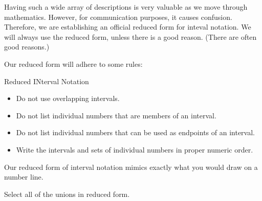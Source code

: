 \documentclass{ximera}
\begin{document}
Having such a wide array of descriptions is very valuable as we move through mathematics.  However, for communication purposes, it causes confusion. Therefore, we are establishing an official reduced form for inteval notation.  We will always use the reduced form, unless there is a good reason.  (There are often good reasons.)

Our reduced form will adhere to some rules:





\begin{notation} Reduced INterval Notation

\begin{itemize}
\item Do not use overlapping intervals.
\item Do not list individual numbers that are members of an interval.
\item Do not list individual numbers that can be used as endpoints of an interval.
\item Write the intervals and sets of individual numbers in proper numeric order.
\end{itemize}

\end{notation}

Our reduced form of interval notation mimics exactly what you would draw on a number line.




\begin{problem}
Select all of the unions in reduced form.
  \begin{selectAll}
  \choice {$[-3, 4) \cup (2, 7)$}
  \choice {$(-3, 2] \cup [4, 7] \cup \{ 3 \}$}
  \choice [correct]{$[-3, 2) \cup \{ 3 \} \cup (4, 7)$}
  \choice {$(4, 7) \cup [-3, 2)$}
  \end{selectAll}
\end{problem}
\end{document}
